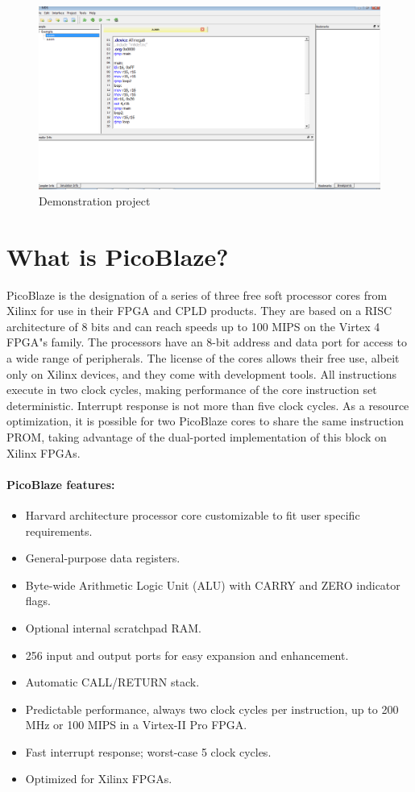     \begin{figure}[h]
        \centering{}
        \includegraphics [scale=0.4]{img/Demonstration_project.png}
        \caption{Demonstration project}
    \end{figure}

\section{What is PicoBlaze?}
    PicoBlaze is the designation of a series of three free soft processor cores from Xilinx for use in their FPGA and CPLD products. They are based on a RISC architecture of 8 bits and can reach speeds up to 100 MIPS on the Virtex 4 FPGA"s family. The processors have an 8-bit address and data port for access to a wide range of peripherals. The license of the cores allows their free use, albeit only on Xilinx devices, and they come with development tools. All instructions execute in two clock cycles, making performance of the core instruction set deterministic. Interrupt response is not more than five clock cycles. As a resource optimization, it is possible for two PicoBlaze cores to share the same instruction PROM, taking advantage of the dual-ported implementation of this block on Xilinx FPGAs.

    \paragraph{PicoBlaze features:}
        \begin{itemize}
            \item Harvard architecture processor core customizable to fit user specific requirements.
            \item General-purpose data registers.
            \item Byte-wide Arithmetic Logic Unit (ALU) with CARRY and ZERO indicator flags.
            \item Optional internal scratchpad RAM.
            \item 256 input and output ports for easy expansion and enhancement.
            \item Automatic CALL/RETURN stack.
            \item Predictable performance, always two clock cycles per instruction, up to 200 MHz or 100 MIPS in a Virtex-II Pro FPGA.
            \item Fast interrupt response; worst-case 5 clock cycles.
            \item Optimized for Xilinx FPGAs.
        \end{itemize}
